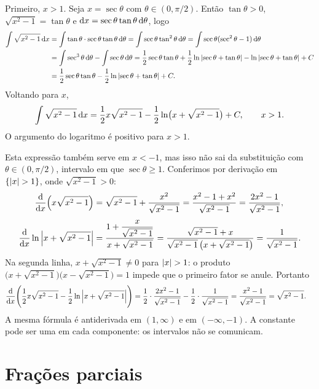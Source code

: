 \documentclass[11pt,a4paper]{article}
\begin{document}
\begin{exemplo}[Família \(\sqrt{x^{2}-a^{2}}\), com \(a=1\), e o sinal]
Primeiro, \(x>1\). Seja \(x=\sec\theta\) com \(\theta\in(0,\pi/2)\). Então \(\tan\theta>0\), \(\sqrt{x^{2}-1}=\tan\theta\) e \(\mathrm{d} x=\sec\theta\tan\theta\,\mathrm{d}\theta\), logo
\begin{align*}
\int\sqrt{x^{2}-1}\,\mathrm{d} x
&=\int\tan\theta\cdot\sec\theta\tan\theta\,\mathrm{d}\theta
=\int\sec\theta\tan^{2}\theta\,\mathrm{d}\theta
=\int\sec\theta(\sec^{2}\theta-1)\,\mathrm{d}\theta\\
&=\int\sec^{3}\theta\,\mathrm{d}\theta-\int\sec\theta\,\mathrm{d}\theta
=\frac12\sec\theta\tan\theta+\frac12\ln\left\lvert \sec\theta+\tan\theta \right\rvert-\ln\left\lvert \sec\theta+\tan\theta \right\rvert+C\\
&=\frac12\sec\theta\tan\theta-\frac12\ln\left\lvert \sec\theta+\tan\theta \right\rvert+C.
\end{align*}
Voltando para \(x\),
\[
\int\sqrt{x^{2}-1}\,\mathrm{d} x
=\frac12 x\sqrt{x^{2}-1}-\frac12\ln\bigl(x+\sqrt{x^{2}-1}\bigr)+C,\qquad x>1.
\]
O argumento do logaritmo é positivo para \(x>1\).

Esta expressão também serve em \(x<-1\), mas isso não sai da substituição com \(\theta\in(0,\pi/2)\), intervalo em que \(\sec\theta\ge 1\). Conferimos por derivação em \(\{\left\lvert x \right\rvert>1\}\), onde \(\sqrt{x^{2}-1}>0\):
\begin{align*}
\frac{\mathrm{d}}{\mathrm{d} x}\Bigl(x\sqrt{x^{2}-1}\Bigr)
&=\sqrt{x^{2}-1}+\frac{x^{2}}{\sqrt{x^{2}-1}}
=\frac{x^{2}-1+x^{2}}{\sqrt{x^{2}-1}}
=\frac{2x^{2}-1}{\sqrt{x^{2}-1}},\\[0.4em]
\frac{\mathrm{d}}{\mathrm{d} x}\ln\left\lvert x+\sqrt{x^{2}-1} \right\rvert
&=\frac{1+\dfrac{x}{\sqrt{x^{2}-1}}}{x+\sqrt{x^{2}-1}}
=\frac{\sqrt{x^{2}-1}+x}{\sqrt{x^{2}-1}\,\bigl(x+\sqrt{x^{2}-1}\bigr)}
=\frac{1}{\sqrt{x^{2}-1}}.
\end{align*}
Na segunda linha, \(x+\sqrt{x^{2}-1}\neq 0\) para \(\left\lvert x \right\rvert>1\): o produto \(\bigl(x+\sqrt{x^{2}-1}\bigr)\bigl(x-\sqrt{x^{2}-1}\bigr)=1\) impede que o primeiro fator se anule. Portanto
\begin{align*}
\frac{\mathrm{d}}{\mathrm{d} x}\Biggl(\frac12 x\sqrt{x^{2}-1}-\frac12\ln\left\lvert x+\sqrt{x^{2}-1} \right\rvert\Biggr)
&=\frac12\cdot\frac{2x^{2}-1}{\sqrt{x^{2}-1}}-\frac12\cdot\frac{1}{\sqrt{x^{2}-1}}
=\frac{x^{2}-1}{\sqrt{x^{2}-1}}
=\sqrt{x^{2}-1}.
\end{align*}
A mesma fórmula é antiderivada em \((1,\infty)\) e em \((-\infty,-1)\). A constante pode ser uma em cada componente: os intervalos não se comunicam.
\end{exemplo}

\section{Frações parciais}
\end{document}
